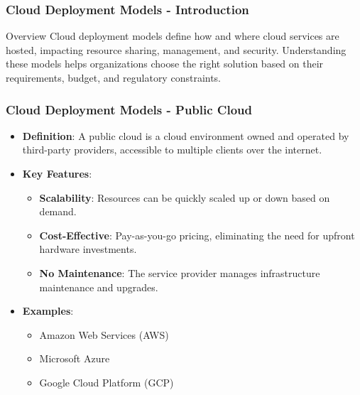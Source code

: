 \documentclass[aspectratio=169]{beamer}
\begin{document}
\begin{frame}[fragile]
    \frametitle{Cloud Deployment Models - Introduction}
    \begin{block}{Overview}
        Cloud deployment models define how and where cloud services are hosted, impacting resource sharing, management, and security. 
        Understanding these models helps organizations choose the right solution based on their requirements, budget, and regulatory constraints.
    \end{block}
\end{frame}

\begin{frame}[fragile]
    \frametitle{Cloud Deployment Models - Public Cloud}
    \begin{itemize}
        \item \textbf{Definition}: A public cloud is a cloud environment owned and operated by third-party providers, accessible to multiple clients over the internet.
        \item \textbf{Key Features}:
            \begin{itemize}
                \item \textbf{Scalability}: Resources can be quickly scaled up or down based on demand.
                \item \textbf{Cost-Effective}: Pay-as-you-go pricing, eliminating the need for upfront hardware investments.
                \item \textbf{No Maintenance}: The service provider manages infrastructure maintenance and upgrades.
            \end{itemize}
        \item \textbf{Examples}:
            \begin{itemize}
                \item Amazon Web Services (AWS)
                \item Microsoft Azure
                \item Google Cloud Platform (GCP)
            \end{itemize}
    \end{itemize}
\end{frame}
\end{document}
